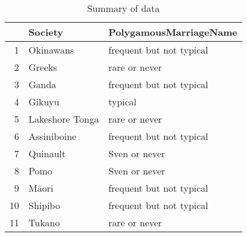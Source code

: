 \begin{table}[ht]
\centering
\begin{tabular}{rll}
  \hline
 & Society & PolygamousMarriageName \\ 
  \hline
1 & Okinawans & frequent but not typical \\ 
  2 & Greeks & rare or never \\ 
  3 & Ganda & frequent but not typical \\ 
  4 & Gikuyu & typical \\ 
  5 & Lakeshore Tonga & rare or never \\ 
  6 & Assiniboine & frequent but not typical \\ 
  7 & Quinault & Sven or never \\ 
  8 & Pomo & Sven or never \\ 
  9 & Māori & frequent but not typical \\ 
  10 & Shipibo & frequent but not typical \\ 
  11 & Tukano & rare or never \\ 
   \hline
\end{tabular}
\caption{Summary of data} 
\end{table}
